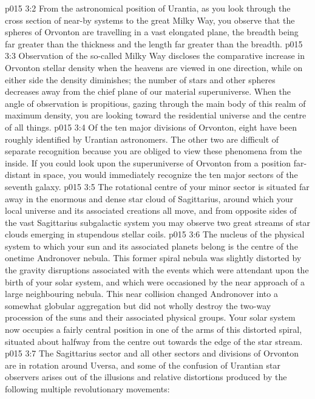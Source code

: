 \vs p015 3:2 From the astronomical position of Urantia, as you look through the cross section of near\hyp{}by systems to the great Milky Way, you observe that the spheres of Orvonton are travelling in a vast elongated plane, the breadth being far greater than the thickness and the length far greater than the breadth.
\vs p015 3:3 Observation of the so\hyp{}called Milky Way discloses the comparative increase in Orvonton stellar density when the heavens are viewed in one direction, while on either side the density diminishes; the number of stars and other spheres decreases away from the chief plane of our material superuniverse. When the angle of observation is propitious, gazing through the main body of this realm of maximum density, you are looking toward the residential universe and the centre of all things.
\vs p015 3:4 \pc Of the ten major divisions of Orvonton, eight have been roughly identified by Urantian astronomers. The other two are difficult of separate recognition because you are obliged to view these phenomena from the inside. If you could look upon the superuniverse of Orvonton from a position far\hyp{}distant in space, you would immediately recognize the ten major sectors of the seventh galaxy.
\vs p015 3:5 The rotational centre of your minor sector is situated far away in the enormous and dense star cloud of Sagittarius, around which your local universe and its associated creations all move, and from opposite sides of the vast Sagittarius subgalactic system you may observe two great streams of star clouds emerging in stupendous stellar coils.
\vs p015 3:6 The nucleus of the physical system to which your sun and its associated planets belong is the centre of the onetime Andronover nebula. This former spiral nebula was slightly distorted by the gravity disruptions associated with the events which were attendant upon the birth of your solar system, and which were occasioned by the near approach of a large neighbouring nebula. This near collision changed Andronover into a somewhat globular aggregation but did not wholly destroy the two\hyp{}way procession of the suns and their associated physical groups. Your solar system now occupies a fairly central position in one of the arms of this distorted spiral, situated about halfway from the centre out towards the edge of the star stream.
\vs p015 3:7 \pc The Sagittarius sector and all other sectors and divisions of Orvonton are in rotation around Uversa, and some of the confusion of Urantian star observers arises out of the illusions and relative distortions produced by the following multiple revolutionary movements:
